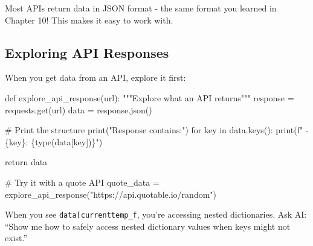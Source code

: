 \documentclass[
  letterpaper,
  DIV=11,
  numbers=noendperiod,
  oneside]{scrreprt}
\newenvironment{Shaded}{}{}
\newcommand{\BuiltInTok}[1]{\textcolor[rgb]{0.84,0.23,0.29}{#1}}
\newcommand{\CommentTok}[1]{\textcolor[rgb]{0.42,0.45,0.49}{#1}}
\newcommand{\ControlFlowTok}[1]{\textcolor[rgb]{0.84,0.23,0.29}{#1}}
\newcommand{\KeywordTok}[1]{\textcolor[rgb]{0.84,0.23,0.29}{#1}}
\newcommand{\NormalTok}[1]{\textcolor[rgb]{0.14,0.16,0.18}{#1}}
\newcommand{\OperatorTok}[1]{\textcolor[rgb]{0.14,0.16,0.18}{#1}}
\newcommand{\SpecialCharTok}[1]{\textcolor[rgb]{0.00,0.36,0.77}{#1}}
\newcommand{\SpecialStringTok}[1]{\textcolor[rgb]{0.01,0.18,0.38}{#1}}
\newcommand{\StringTok}[1]{\textcolor[rgb]{0.01,0.18,0.38}{#1}}
\begin{document}
Most APIs return data in JSON format - the same format you learned in
Chapter 10! This makes it easy to work with.

\subsection{Exploring API Responses}\label{exploring-api-responses}

When you get data from an API, explore it first:

\begin{Shaded}
\begin{Highlighting}[]
\KeywordTok{def}\NormalTok{ explore\_api\_response(url):}
    \CommentTok{"""Explore what an API returns"""}
\NormalTok{    response }\OperatorTok{=}\NormalTok{ requests.get(url)}
\NormalTok{    data }\OperatorTok{=}\NormalTok{ response.json()}
    
    \CommentTok{\# Print the structure}
    \BuiltInTok{print}\NormalTok{(}\StringTok{"Response contains:"}\NormalTok{)}
    \ControlFlowTok{for}\NormalTok{ key }\KeywordTok{in}\NormalTok{ data.keys():}
        \BuiltInTok{print}\NormalTok{(}\SpecialStringTok{f"  {-} }\SpecialCharTok{\{}\NormalTok{key}\SpecialCharTok{\}}\SpecialStringTok{: }\SpecialCharTok{\{}\BuiltInTok{type}\NormalTok{(data[key])}\SpecialCharTok{\}}\SpecialStringTok{"}\NormalTok{)}
    
    \ControlFlowTok{return}\NormalTok{ data}

\CommentTok{\# Try it with a quote API}
\NormalTok{quote\_data }\OperatorTok{=}\NormalTok{ explore\_api\_response(}\StringTok{"https://api.quotable.io/random"}\NormalTok{)}
\end{Highlighting}
\end{Shaded}

\begin{tcolorbox}[enhanced jigsaw, opacityback=0, colback=white, colframe=quarto-callout-warning-color-frame, breakable, titlerule=0mm, coltitle=black, rightrule=.15mm, colbacktitle=quarto-callout-warning-color!10!white, left=2mm, bottomtitle=1mm, bottomrule=.15mm, title=\textcolor{quarto-callout-warning-color}{\faExclamationTriangle}\hspace{0.5em}{Expression Explorer: Dictionary Access}, opacitybacktitle=0.6, toptitle=1mm, leftrule=.75mm, arc=.35mm, toprule=.15mm]

When you see
\texttt{data{[}\textquotesingle{}current\textquotesingle{}{]}{[}\textquotesingle{}temp\_f\textquotesingle{}{]}},
you're accessing nested dictionaries. Ask AI: ``Show me how to safely
access nested dictionary values when keys might not exist.''

\end{tcolorbox}
\end{document}
